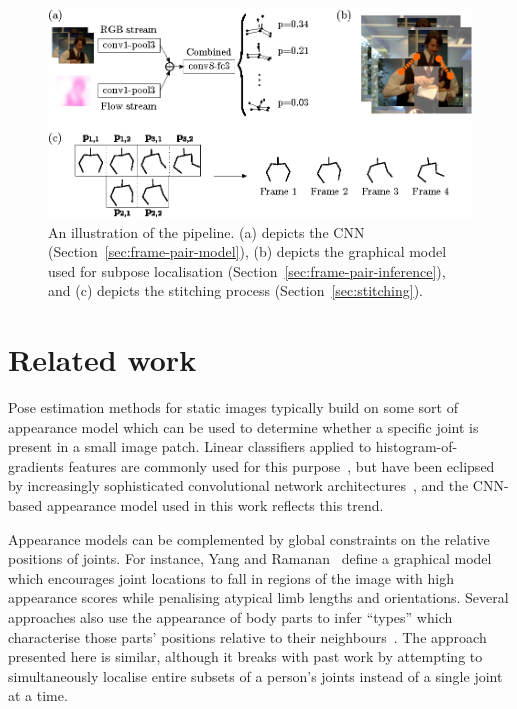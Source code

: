 \documentclass[runningheads]{llncs}
\begin{document}
\begin{figure}[t]
\begin{center}
\includegraphics{figures/pipeline/full-pipeline.eps}
\end{center}
\vspace{-7mm}
\caption{An illustration of the pipeline. (a) depicts the CNN
(Section~\ref{sec:frame-pair-model}), (b) depicts the graphical model used for subpose
localisation (Section~\ref{sec:frame-pair-inference}), and (c) depicts the
stitching process (Section~\ref{sec:stitching}).}
\label{fig:pipeline}
\end{figure}

\section{Related work}\label{sec:related-work}

Pose estimation methods for static images typically build on some sort of
appearance model which can be used to determine whether a specific joint is
present in a small image patch. Linear classifiers applied to
histogram-of-gradients features are commonly used for this
purpose~\cite{yang2011articulated,cherian2014mixing}, but have been eclipsed by
increasingly sophisticated convolutional network
architectures~\cite{jain2014modeep,tompson2014joint,chen2014articulated,pfister2015flowing,wei2016convolutional},
and the CNN-based appearance model used in this work reflects this trend.

Appearance models can be complemented by global constraints on the relative
positions of joints. For instance, Yang and Ramanan~\cite{yang2011articulated}
define a graphical model which encourages joint locations to fall in regions of
the image with high appearance scores while penalising atypical limb lengths and
orientations. Several approaches also use the appearance of body parts to infer
``types'' which characterise those parts' positions relative to their
neighbours~\cite{yang2011articulated,chen2014articulated}. The approach
presented here is similar, although it breaks with past work by attempting to
simultaneously localise entire subsets of a person's joints instead of a single
joint at a time.
\end{document}
